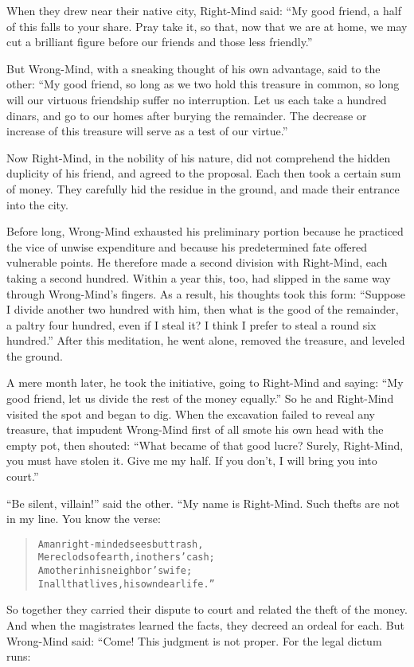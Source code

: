 \documentclass[article, twoside, 14pt]{memoir}
\renewenvironment{verbatim}{%
\begin{quote}%
\vskip -10pt%
\begin{alltt}\normalfont\large}{\end{alltt}%
\end{quote}%
\vskip -10pt
} %
\begin{document}
When they drew near their native city, Right-Mind said:
``My good friend, a half of this falls to your share. Pray take it, so that, now that we are at home, we may cut a brilliant figure before our friends and those less friendly.''

But Wrong-Mind, with a sneaking thought of his own advantage, said
to the other:
``My good friend, so long as we two hold this treasure in common, so long will our virtuous friendship suffer no interruption. Let us each take a hundred dinars, and go to our homes after burying the remainder. The decrease or increase of this treasure will serve as a test of our virtue.''

Now Right-Mind, in the nobility of his nature, did not comprehend
the hidden duplicity of his friend, and agreed to the proposal.
Each then took a certain sum of money. They carefully hid the
residue in the ground, and made their entrance into the city.

Before long, Wrong-Mind exhausted his preliminary portion
because he practiced the vice of unwise expenditure and because his
predetermined fate offered vulnerable points. He therefore made a
second division with Right-Mind, each taking a second hundred.
Within a year this, too, had slipped in the same way through
Wrong-Mind's fingers. As a result, his thoughts took this form:
``Suppose I divide another two hundred with him, then what is the good of the remainder, a paltry four hundred, even if I steal it? I think I prefer to steal a round six hundred.''
After this meditation, he went alone, removed the treasure, and
leveled the ground.

A mere month later, he took the initiative, going to Right-Mind and
saying:
``My good friend, let us divide the rest of the money equally.'' So
he and Right-Mind visited the spot and began to dig. When the
excavation failed to reveal any treasure, that impudent Wrong-Mind
first of all smote his own head with the empty pot, then shouted:
``What became of that good lucre? Surely, Right-Mind, you must have stolen it. Give me my half. If you don't, I will bring you into court.''

``Be silent, villain!'' said the other. “My name is Right-Mind.
Such thefts are not in my line. You know the verse:

\begin{verbatim}
A man right-minded sees but trash,
Mere clods of earth, in others' cash;
A mother in his neighbor's wife;
In all that lives, his own dear life.”
\end{verbatim}
So together they carried their dispute to court and related the
theft of the money. And when the magistrates learned the facts,
they decreed an ordeal for each. But Wrong-Mind said: “Come! This
judgment is not proper. For the legal dictum runs:
\end{document}
